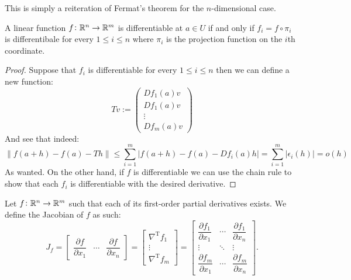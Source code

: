 \documentclass[11pt,a4paper]{article}
\begin{document}
\begin{remark}
  This is simply a reiteration of Fermat's theorem for the $n$-dimensional
  case.
\end{remark}

\begin{proposition}
  A linear function $f \colon \mathbb{R}^n \to \mathbb{R}^m$ is differentiable at 
  $a \in U$ if and only if $f_i = f \circ \pi_i$ is differentibale 
  for every $1 \le i \le n$ where $\pi_i$ is the projection function 
  on the $i$th coordinate.
\end{proposition}
\begin{proof}
  Suppose that $f_i$ is differentiable for every $1 \le i \le n$ then
  we can define a new function:
  \[
    Tv := \begin{pmatrix}Df_1(a)v \\ Df_1(a)v \\ 
    \vdots \\ Df_m(a)v \end{pmatrix}
  \]
  And see that indeed:
  \[
    \|f(a + h) - f(a) - Th\| \le 
    \sum_{i=1}^{m}|f(a + h) - f(a) - Df_i(a)h| = 
    \sum_{i=1}^{m}|\epsilon_i(h)| = o(h)
  \]
  As wanted. On the other hand, if $f$ is differentiable we can use
  the chain rule to show that each $f_i$ is differentiable with the
  desired derivative.
\end{proof}
\begin{definition}[Jacobian]
  Let $f \colon \mathbb{R}^n \to \mathbb{R}^m$ such that each of its first-order partial 
  derivatives exists. We define the Jacobian of $f$ as such:
  \[
    {J_{f}} ={\begin{bmatrix}{\dfrac {\partial {f} }
    {\partial x_{1}}}&\cdots &{\dfrac {\partial {f} }{\partial 
    x_{n}}}\end{bmatrix}}={\begin{bmatrix}\nabla ^{\mathrm {T} }f_{1}\\
    \vdots \\\nabla ^{\mathrm {T} }f_{m}\end{bmatrix}}={\begin{bmatrix}
    {\dfrac {\partial f_{1}}{\partial x_{1}}}&\cdots &{\dfrac {\partial 
    f_{1}}{\partial x_{n}}}\\\vdots &\ddots &\vdots \\{\dfrac {\partial 
    f_{m}}{\partial x_{1}}}&\cdots &{\dfrac {\partial f_{m}}{\partial 
    x_{n}}}\end{bmatrix}}.
  \]
\end{definition}
\end{document}
